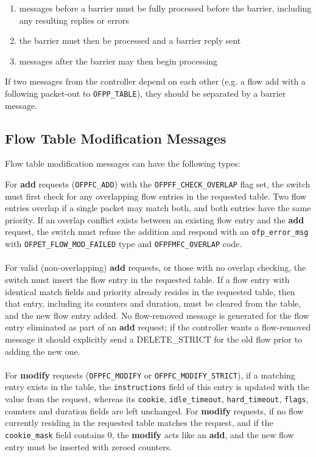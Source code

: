 \documentclass[10pt]{article}
\begin{document}
\begin{enumerate}
\item messages before a barrier must be fully processed before the barrier, including any resulting replies or errors
\item the barrier must then be processed and a barrier reply sent
\item messages after the barrier may then begin processing
\end{enumerate}
If two messages from the controller depend on each other (e.g. a flow add with a following packet-out to \verb|OFPP_TABLE|), they should be separated by a barrier message.


\subsection{Flow Table Modification Messages}
\label{sec:flow mod messages}
\label{flow_table:sec_chan:flow_add}
\label{flow_table:sec_chan:flow_mod}
\label{flow_table:sec_chan:flow_removal}
Flow table modification messages can have the following types:

For \textbf{add} requests (\verb|OFPFC_ADD|) with the \verb|OFPFF_CHECK_OVERLAP| flag set, the switch must first check for any overlapping flow entries in the requested table.  Two flow entries overlap if a single packet may match both, and both entries have the same priority.  If an overlap conflict exists between an existing flow entry and the \textbf{add} request, the switch must refuse the addition and respond with an \verb|ofp_error_msg| with \verb|OFPET_FLOW_MOD_FAILED| type and \verb|OFPFMFC_OVERLAP| code.
\\\\
For valid (non-overlapping) \textbf{add} requests, or those with no overlap checking, the switch must insert the flow entry in the requested table.  If a flow entry with identical match fields and priority already resides in the requested table, then that entry, including its counters and duration, must be cleared from the table, and the new flow entry added. No flow-removed message is generated for the flow entry eliminated as part of an \textbf{add} request; if the controller wants a flow-removed message it should explicitly send a DELETE\_STRICT for the old flow prior to adding the new one.
\\\\
For \textbf{modify} requests (\verb|OFPFC_MODIFY| or \verb|OFPFC_MODIFY_STRICT|), if a matching entry exists in the table, the \verb|instructions| field of this entry is updated with the value from the request, whereas its \verb|cookie|, \verb|idle_timeout|, \verb|hard_timeout|, \verb|flags|, counters and duration fields are left unchanged. For \textbf{modify} requests, if no flow currently residing in the requested table matches the request, and if the \verb|cookie_mask| field contains 0, the \textbf{modify} acts like an \textbf{add}, and the new flow entry must be inserted with zeroed counters.
\end{document}
